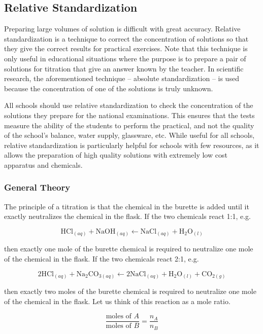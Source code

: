 \subsection{Relative Standardization}

Preparing large volumes of solution is difficult with great accuracy. Relative standardization is a technique to correct the concentration of solutions so that they give the correct results for practical exercises. Note that this technique is only useful in educational situations where the purpose is to prepare a pair of solutions for titration that give an answer known by the teacher. In scientific research, the aforementioned technique -- absolute standardization -- is used because the concentration of one of the solutions is truly unknown.

All schools should use relative standardization to check the concentration of the solutions they prepare for the national examinations. This ensures that the tests measure the ability of the students to perform the practical, and not the quality of the school's balance, water supply, glassware, etc. While useful for all schools, relative standardization is particularly helpful for schools with few resources, as it allows the preparation of high quality solutions with extremely low cost apparatus and chemicals.

\subsubsection{General Theory}

The principle of a titration is that the chemical in the burette is added until it exactly neutralizes the chemical in the flask. If the two chemicals react 1:1, e.g. 

\[ \mathrm{HCl}_{(aq)} + \mathrm{NaOH}_{(aq)} \longleftarrow \mathrm{NaCl}_{(aq)} + \mathrm{H}_{2}\mathrm{O}_{(l)} \]

then exactly one mole of the burette chemical is required to neutralize one mole of the chemical in the flask. If the two chemicals react 2:1, e.g. 

\[ 2\mathrm{HCl}_{(aq)} + \mathrm{Na}_{2}\mathrm{CO}_{3(aq)} \longleftarrow 2\mathrm{NaCl}_{(aq)} + \mathrm{H}_{2}\mathrm{O}_{(l)} + \mathrm{CO}_{2(g)} \]

then exactly two moles of the burette chemical is required to neutralize one mole of the chemical in the flask. Let us think of this reaction as a mole ratio.

\[ \frac{\mbox{moles of }A}{\mbox{moles of }B} = \frac{n_{A}}{n_{B}} \]

